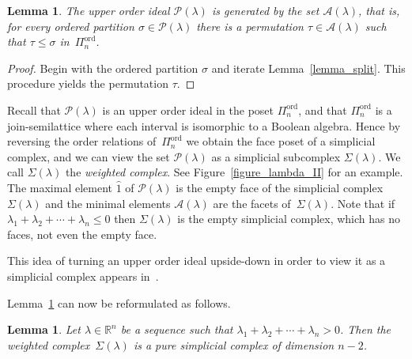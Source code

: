 \documentclass[10pt]{amsart}
\newtheorem{lemma}[theorem]{Lemma}
\theoremstyle{definition}
\newcommand{\Rrr}{\mathbb{R}}
\DeclareMathOperator{\ord}{ord}
\newcommand{\ho}{\hat{1}}
\newcommand{\Qn}{\Pi^{\ord}_{n}}
\newcommand{\lambdasumpositive}
{\lambda_{1} + \lambda_{2} + \cdots + \lambda_{n} > 0}
\newcommand{\lambdasumnonpositive}
{\lambda_{1} + \lambda_{2} + \cdots + \lambda_{n} \leq 0}
\begin{document}
\begin{lemma}
The upper order ideal $\mathcal{P}(\lambda)$
is generated by the set $\mathcal{A}(\lambda)$,
that is, for every ordered partition $\sigma \in \mathcal{P}(\lambda)$
there is a permutation $\tau \in \mathcal{A}(\lambda)$
such that $\tau \leq \sigma$ in~$\Qn$.
\label{lemma_P_A}
\end{lemma}
\begin{proof}
Begin with the ordered partition $\sigma$
and iterate Lemma~\ref{lemma_split}.
This procedure yields the permutation $\tau$.
\end{proof}




Recall that $\mathcal{P}(\lambda)$
is an upper order ideal in the poset $\Qn$, and that
$\Qn$ is a join-semilattice
where each interval is isomorphic to a Boolean algebra.
Hence by reversing the order relations of~$\Qn$
we obtain the face poset of a simplicial
complex, and
we can view the set $\mathcal{P}(\lambda)$
as a simplicial subcomplex
$\Sigma(\lambda)$.
We call
$\Sigma(\lambda)$
the \emph{weighted complex}.
See Figure~\ref{figure_lambda_II} for an example.
The maximal element $\ho$ of $\mathcal{P}(\lambda)$
is the empty face of the simplicial complex $\Sigma(\lambda)$ 
and the minimal elements $\mathcal{A}(\lambda)$ are
the facets of~$\Sigma(\lambda)$.
Note that if $\lambdasumnonpositive$ then
$\Sigma(\lambda)$ is the empty simplicial complex,
which has no faces, not even the empty face.

This idea of turning an upper order ideal upside-down
in order to view it as a simplicial complex
appears in~\cite{Ehrenborg_Hedmark,Ehrenborg_Jung}.




Lemma~\ref{lemma_P_A}
can now be reformulated as follows.
\begin{lemma}
Let $\lambda \in \Rrr^{n}$ be a sequence
such that $\lambdasumpositive$.
Then
the weighted complex~$\Sigma(\lambda)$
is a pure simplicial complex of dimension $n-2$.
\label{lemma_pure}
\end{lemma}
\end{document}
